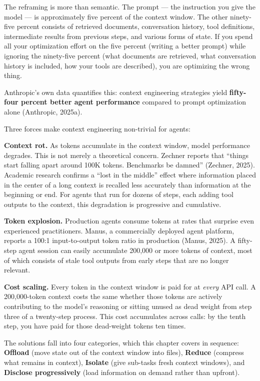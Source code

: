 \documentclass[11pt, a4paper]{article}
\begin{document}
The reframing is more than semantic. The prompt --- the instruction you
give the model --- is approximately five percent of the context window.
The other ninety-five percent consists of retrieved documents,
conversation history, tool definitions, intermediate results from
previous steps, and various forms of state. If you spend all your
optimization effort on the five percent (writing a better prompt) while
ignoring the ninety-five percent (what documents are retrieved, what
conversation history is included, how your tools are described), you are
optimizing the wrong thing.

Anthropic's own data quantifies this: context engineering strategies
yield \textbf{fifty-four percent better agent performance} compared to
prompt optimization alone (Anthropic, 2025a).

Three forces make context engineering non-trivial for agents:

\textbf{Context rot.} As tokens accumulate in the context window, model
performance degrades. This is not merely a theoretical concern. Zechner
reports that ``things start falling apart around 100K tokens. Benchmarks
be damned'' (Zechner, 2025). Academic research confirms a ``lost in the
middle'' effect where information placed in the center of a long context
is recalled less accurately than information at the beginning or end.
For agents that run for dozens of steps, each adding tool outputs to the
context, this degradation is progressive and cumulative.

\textbf{Token explosion.} Production agents consume tokens at rates that
surprise even experienced practitioners. Manus, a commercially deployed
agent platform, reports a 100:1 input-to-output token ratio in
production (Manus, 2025). A fifty-step agent session can easily
accumulate 200,000 or more tokens of context, most of which consists of
stale tool outputs from early steps that are no longer relevant.

\textbf{Cost scaling.} Every token in the context window is paid for at
\emph{every} API call. A 200,000-token context costs the same whether
those tokens are actively contributing to the model's reasoning or
sitting unused as dead weight from step three of a twenty-step process.
This cost accumulates across calls: by the tenth step, you have paid for
those dead-weight tokens ten times.

The solutions fall into four categories, which this chapter covers in
sequence: \textbf{Offload} (move state out of the context window into
files), \textbf{Reduce} (compress what remains in context),
\textbf{Isolate} (give sub-tasks fresh context windows), and
\textbf{Disclose progressively} (load information on demand rather than
upfront).
\end{document}
